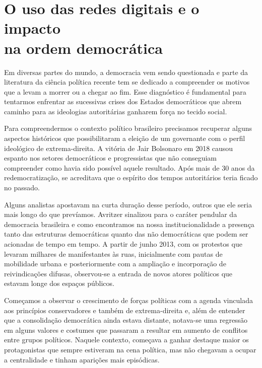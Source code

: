 \chapter{O uso das redes digitais e o impacto\\na ordem democrática}

Em diversas partes do mundo, a democracia vem sendo questionada e parte
da literatura da ciência política recente tem se dedicado a compreender
os motivos que a levam a morrer ou a chegar ao fim. Esse
diagnóstico é fundamental para tentarmos enfrentar as sucessivas crises
dos Estados democráticos que abrem caminho para as ideologias
autoritárias ganharem força no tecido social.

Para compreendermos o contexto político brasileiro precisamos recuperar
alguns aspectos históricos que possibilitaram a eleição de um governante
com o perfil ideológico de extrema-direita. A vitória de Jair Bolsonaro
em 2018 causou espanto nos setores democráticos e progressistas que não
conseguiam compreender como havia sido possível aquele resultado. Após
mais de 30 anos da redemocratização, se acreditava que o espírito dos
tempos autoritários teria ficado no passado.

Alguns analistas apostavam na curta duração desse período, outros que
ele seria mais longo do que prevíamos. Avritzer sinalizou para o 
caráter pendular da democracia brasileira e como encontramos na nossa
institucionalidade a presença tanto das estruturas democráticas quanto
das não democráticas que podem ser acionadas de tempo em tempo. A partir
de junho 2013, com os protestos que levaram milhares de manifestantes às
ruas, inicialmente com pautas de mobilidade urbana e posteriormente com
a ampliação e incorporação de reivindicações difusas, observou-se a
entrada de novos atores políticos que estavam longe dos espaços
públicos.

Começamos a observar o crescimento de forças políticas com a agenda
vinculada aos princípios conservadores e também de extrema-direita e,
além de entender que a consolidação democrática ainda estava distante,
notava-se uma regressão em alguns valores e costumes que passaram a
resultar em aumento de conflitos entre grupos políticos. Naquele
contexto, começava a ganhar destaque maior os protagonistas que sempre
estiveram na cena política, mas não chegavam a ocupar a centralidade e
tinham aparições mais episódicas.

